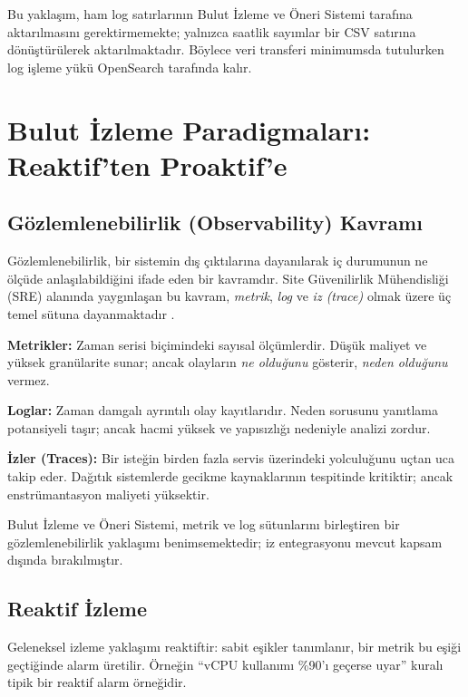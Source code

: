Bu yaklaşım, ham log satırlarının Bulut İzleme ve Öneri Sistemi tarafına aktarılmasını gerektirmemekte; yalnızca saatlik sayımlar bir CSV satırına dönüştürülerek aktarılmaktadır.
Böylece veri transferi minimumsda tutulurken log işleme yükü OpenSearch tarafında kalır.


\section{Bulut İzleme Paradigmaları: Reaktif'ten Proaktif'e}
\label{sec:izlemeparadigmalari}

\subsection{Gözlemlenebilirlik (Observability) Kavramı}

Gözlemlenebilirlik, bir sistemin dış çıktılarına dayanılarak iç durumunun ne ölçüde anlaşılabildiğini ifade eden bir kavramdır.
Site Güvenilirlik Mühendisliği (SRE) alanında yaygınlaşan bu kavram, \textit{metrik}, \textit{log} ve \textit{iz (trace)} olmak üzere üç temel sütuna dayanmaktadır \autocite{beyer2016}.

\begin{maddelendir}[label=--]
    \item \textbf{Metrikler:} Zaman serisi biçimindeki sayısal ölçümlerdir.
    Düşük maliyet ve yüksek granülarite sunar; ancak olayların \textit{ne olduğunu} gösterir, \textit{neden olduğunu} vermez.
    \item \textbf{Loglar:} Zaman damgalı ayrıntılı olay kayıtlarıdır.
    Neden sorusunu yanıtlama potansiyeli taşır; ancak hacmi yüksek ve yapısızlığı nedeniyle analizi zordur.
    \item \textbf{İzler (Traces):} Bir isteğin birden fazla servis üzerindeki yolculuğunu uçtan uca takip eder.
    Dağıtık sistemlerde gecikme kaynaklarının tespitinde kritiktir; ancak enstrümantasyon maliyeti yüksektir.
\end{maddelendir}

Bulut İzleme ve Öneri Sistemi, metrik ve log sütunlarını birleştiren bir gözlemlenebilirlik yaklaşımı benimsemektedir; iz entegrasyonu mevcut kapsam dışında bırakılmıştır.

\subsection{Reaktif İzleme}

Geleneksel izleme yaklaşımı reaktiftir: sabit eşikler tanımlanır, bir metrik bu eşiği geçtiğinde alarm üretilir.
Örneğin ``vCPU kullanımı \%90'ı geçerse uyar'' kuralı tipik bir reaktif alarm örneğidir.

